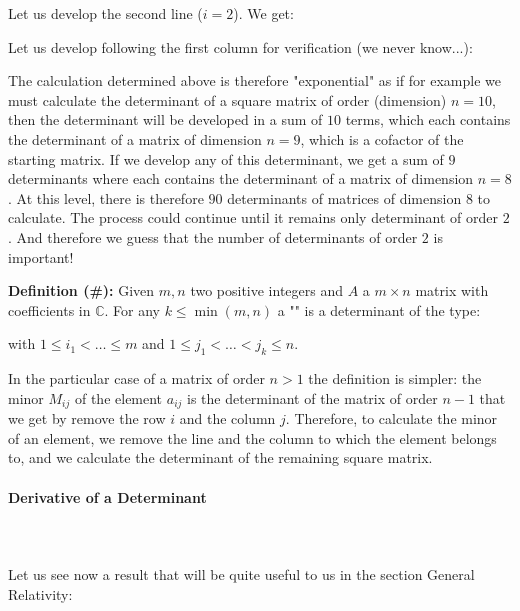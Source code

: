 \begin{enumerate}
\begin{tcolorbox}[colframe=black,colback=white,sharp corners]
		Let us develop the second line ($i=2$). We get:
		\end{tcolorbox}
		
		\pagebreak
		\begin{tcolorbox}[colframe=black,colback=white,sharp corners]
			
		Let us develop following the first column for verification (we never know...):
		
		The calculation determined above is therefore "exponential" as if for example we must calculate the determinant of a square matrix of order (dimension) $n=10$, then the determinant will be developed in a sum of $10$ terms, which each contains the determinant of a matrix of dimension $n=9$, which is a cofactor of the starting matrix. If we develop any of this determinant, we get a sum of $9$ determinants where each contains the determinant of a matrix of dimension $n=8$. At this level, there is therefore $90$ determinants of matrices of dimension $8$ to calculate. The process could continue until it remains only determinant of order $2$. And therefore we guess that the number of determinants of order $2$ is important!
		\end{tcolorbox}
	\end{enumerate}

	\textbf{Definition (\#\mydef):} Given $m,n$ two positive integers and $A$ a $m\times n$ matrix with coefficients in $\mathbb{C}$. For any $k\leq \min(m,n)$ a "\label{minor}" is a determinant of the type:	
	
	with $1\leq i_1< \ldots \leq m$ and $1\leq j_1 <\ldots <j_k\leq n$.
	
	In the particular case of a matrix of order $n>1$ the definition is simpler: the minor $M_{ij}$ of the element $a_{ij}$ is the determinant of the matrix of order $n-1$ that we get by remove the row $i$ and the column $j$. Therefore, to calculate the minor of an element, we remove the line and the column to which the element belongs to, and we calculate the determinant of the remaining square matrix.
	
	\pagebreak
	\paragraph{Derivative of a Determinant}\label{derivative of a determinant}\mbox{}\\\\
	Let us see now a result that will be quite useful to us in the section General Relativity:

